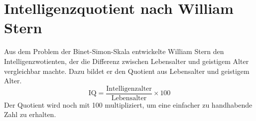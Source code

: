 \section{Intelligenzquotient nach William Stern}
Aus dem Problem der Binet-Simon-Skala entwickelte William Stern den Intelligenzwotienten, der die Differenz zwischen Lebensalter und geistigem Alter vergleichbar machte. Dazu bildet er den Quotient aus Lebensalter und geistigem Alter.
$$ \mathrm{IQ} = \frac{\mathrm{Intelligenzalter}}{\mathrm{Lebensalter}} \times 100 $$
Der Quotient wird noch mit 100 multipliziert, um eine einfacher zu handhabende Zahl zu erhalten.

